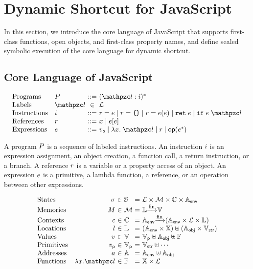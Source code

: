 \section{Dynamic Shortcut for JavaScript}\label{sec:javascript}

In this section, we introduce the core language of JavaScript that supports
first-class functions, open objects, and first-class property names, and define
sealed symbolic execution of the core language for dynamic shortcut.


\subsection{Core Language of JavaScript}

\[
  \begin{array}{ll@{~}c@{~}l}
    \text{Programs} & \prog &::=& (\lab: \inst)^*\\

    \text{Labels} & \lab &\in& \labset\\

    \text{Instructions} & \inst &::=&
    \refer = \expr \mid
    \refer = \kwobj \mid
    \refer = \expr ( \expr ) \mid
    \kwret \; \expr \mid
    \kwif \; \expr \; \lab\\

    \text{References} & \refer &::=&
    x \mid
    \expr [ \expr ]\\

    \text{Expressions} & \expr &::=&
    \pval \mid
    \lambda x. \; \lab \mid
    \refer \mid
    \op(\expr^*)\\
  \end{array}
\]

A program $P$ is a sequence of labeled instructions. An instruction $i$
is an expression assignment, an object creation, a function call, a return
instruction, or a branch.  A reference $r$ is a variable or a property
access of an object.  An expression $e$ is a primitive, a lambda function, a
reference, or an operation between other expressions.

\[
  \begin{array}{lr@{~}c@{~}l@{~}c@{~}l}
    \text{States} & \st &\in& \stset &=& \labset \times \memset \times
    \ctxtset \times \eaddrset\\
    \text{Memories} & \mem &\in& \memset &=& \locset \finmap \valset\\
    \text{Contexts} & \ctxt &\in& \ctxtset &=& \eaddrset \finmap (\eaddrset
    \times \labset \times \locset)\\
    \text{Locations} & \loc &\in& \locset &=& (\eaddrset \times \varset) \uplus
    (\oaddrset \times \strset)\\
    \text{Values} & \val &\in& \valset &=& \pvalset \uplus \oaddrset \uplus
    \fvalset\\
    \text{Primitives} & \pval &\in& \pvalset &=& \strset \uplus \cdots\\
    \text{Addresses} & \addr &\in& \addrset &=& \eaddrset \uplus \oaddrset\\
    \text{Functions} & \fval{x}{\lab} &\in& \fvalset &=& \varset \times
    \labset\\
  \end{array}
\]

